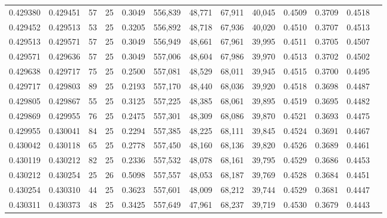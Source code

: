 \begin{tabular}{rrrrrrrrrrrrr}
0.429380 & 0.429451 &    57 &  25 &                                     0.3049 & 556,839 &  48,771 &  67,911 &  40,045 & 0.4509 & 0.3709 & 0.4518 \\
0.429452 & 0.429513 &    53 &  25 &                                     0.3205 & 556,892 &  48,718 &  67,936 &  40,020 & 0.4510 & 0.3707 & 0.4513 \\
0.429513 & 0.429571 &    57 &  25 &                                     0.3049 & 556,949 &  48,661 &  67,961 &  39,995 & 0.4511 & 0.3705 & 0.4507 \\
0.429571 & 0.429636 &    57 &  25 &                                     0.3049 & 557,006 &  48,604 &  67,986 &  39,970 & 0.4513 & 0.3702 & 0.4502 \\
0.429638 & 0.429717 &    75 &  25 &                                     0.2500 & 557,081 &  48,529 &  68,011 &  39,945 & 0.4515 & 0.3700 & 0.4495 \\
0.429717 & 0.429803 &    89 &  25 &                                     0.2193 & 557,170 &  48,440 &  68,036 &  39,920 & 0.4518 & 0.3698 & 0.4487 \\
0.429805 & 0.429867 &    55 &  25 &                                     0.3125 & 557,225 &  48,385 &  68,061 &  39,895 & 0.4519 & 0.3695 & 0.4482 \\
0.429869 & 0.429955 &    76 &  25 &                                     0.2475 & 557,301 &  48,309 &  68,086 &  39,870 & 0.4521 & 0.3693 & 0.4475 \\
0.429955 & 0.430041 &    84 &  25 &                                     0.2294 & 557,385 &  48,225 &  68,111 &  39,845 & 0.4524 & 0.3691 & 0.4467 \\
0.430042 & 0.430118 &    65 &  25 &                                     0.2778 & 557,450 &  48,160 &  68,136 &  39,820 & 0.4526 & 0.3689 & 0.4461 \\
0.430119 & 0.430212 &    82 &  25 &                                     0.2336 & 557,532 &  48,078 &  68,161 &  39,795 & 0.4529 & 0.3686 & 0.4453 \\
0.430212 & 0.430254 &    25 &  26 &                                     0.5098 & 557,557 &  48,053 &  68,187 &  39,769 & 0.4528 & 0.3684 & 0.4451 \\
0.430254 & 0.430310 &    44 &  25 &                                     0.3623 & 557,601 &  48,009 &  68,212 &  39,744 & 0.4529 & 0.3681 & 0.4447 \\
0.430311 & 0.430373 &    48 &  25 &                                     0.3425 & 557,649 &  47,961 &  68,237 &  39,719 & 0.4530 & 0.3679 & 0.4443 \\

\end{tabular}
